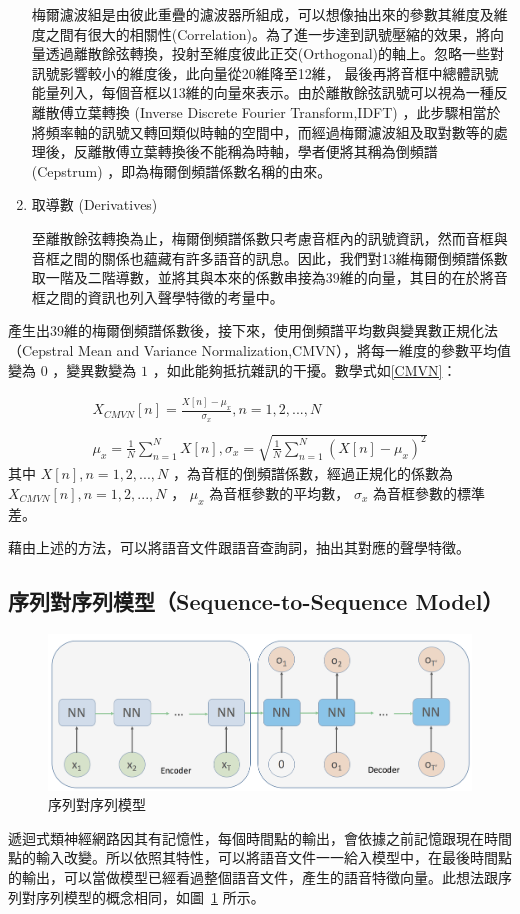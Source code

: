 \begin{enumerate}
		梅爾濾波組是由彼此重疊的濾波器所組成，可以想像抽出來的參數其維度及維度之間有很大的相關性(Correlation)。為了進一步達到訊號壓縮的效果，將向量透過離散餘弦轉換，投射至維度彼此正交(Orthogonal)的軸上。忽略一些對訊號影響較小的維度後，此向量從20維降至12維，
		最後再將音框中總體訊號能量列入，每個音框以13維的向量來表示。由於離散餘弦訊號可以視為一種反離散傅立葉轉換
		(Inverse Discrete Fourier Transform,IDFT)
		，此步驟相當於將頻率軸的訊號又轉回類似時軸的空間中，而經過梅爾濾波組及取對數等的處理後，反離散傅立葉轉換後不能稱為時軸，學者便將其稱為倒頻譜
		(Cepstrum) ，即為梅爾倒頻譜係數名稱的由來。
	\item 取導數 (Derivatives)
		
		至離散餘弦轉換為止，梅爾倒頻譜係數只考慮音框內的訊號資訊，然而音框與音框之間的關係也蘊藏有許多語音的訊息。因此，我們對13維梅爾倒頻譜係數取一階及二階導數，並將其與本來的係數串接為39維的向量，其目的在於將音框之間的資訊也列入聲學特徵的考量中。
\end{enumerate}

產生出39維的梅爾倒頻譜係數後，接下來，使用倒頻譜平均數與變異數正規化法（Cepstral
Mean and Variance
Normalization,CMVN），將每一維度的參數平均值變為 $ 0 $ ，變異數變為 $ 1 $ ，如此能夠抵抗雜訊的干擾。數學式如\ref{CMVN}：

\begin{equation}
\begin{aligned}
X_{CMVN}[n] = \frac{ X[n] - \mu_x }{ \sigma_x } ,n = 1,2,...,N
\\
\\
\mu_{x} = \frac{1}{N} \sum_{n=1}^N {X[n]}, \sigma_x = \sqrt{\frac{1}{N}\sum_{n=1}^N{ (X[n] -\mu_{x} )^2}}
\end{aligned}
\label{CMVN}
\end{equation}
其中 $ X[n],n= 1, 2, ...,N $ ，為音框的倒頻譜係數，經過正規化的係數為 $ X_{CMVN}[n],n =
1,2,...,N $ ， $ \mu_x $  為音框參數的平均數， $ \sigma_x $  為音框參數的標準差。

藉由上述的方法，可以將語音文件跟語音查詢詞，抽出其對應的聲學特徵。
\subsection{序列對序列模型（Sequence-to-Sequence Model）\cite{sutskever2014sequence}}
\begin{figure}[h]
\centering
\includegraphics[scale=0.5]{images/ch3_seq2seq.png} 
\caption{序列對序列模型}
\label{ch3_seq2seq}
\end{figure}
\label{seq2seq}
遞迴式類神經網路因其有記憶性，每個時間點的輸出，會依據之前記憶跟現在時間點的輸入改變。所以依照其特性，可以將語音文件一一給入模型中，在最後時間點的輸出，可以當做模型已經看過整個語音文件，產生的語音特徵向量。此想法跟序列對序列模型的概念相同，如圖~\ref{ch3_seq2seq}
所示。

